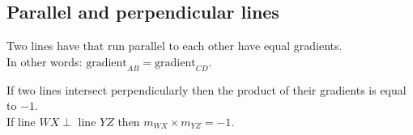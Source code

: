 \subsection*{Parallel and perpendicular lines}    
% 
Two lines have that run parallel to each other have equal gradients. \\
In other words: $\mbox{gradient}_{AB}=\mbox{gradient}_{CD}$. \par
If two lines intersect perpendicularly then the product of their gradients is equal to $-1$. \\

If line $WX \perp $ line $ YZ$ then $m_{WX} \times m_{YZ} = -1$.


